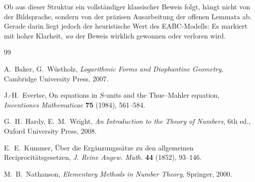 \documentclass[12pt,a4paper]{article}
\theoremstyle{plain}
\theoremstyle{definition}
\theoremstyle{remark}
\begin{document}
	Ob aus dieser Struktur ein vollständiger klassischer Beweis folgt, hängt nicht von der Bildsprache, sondern von der präzisen Ausarbeitung der offenen Lemmata ab. Gerade darin liegt jedoch der heuristische Wert des EABC-Modells: Es markiert mit hoher Klarheit, \emph{wo} der Beweis wirklich gewonnen oder verloren wird.
	
	\begin{thebibliography}{99}
		
		A.~Baker, G.~Wüstholz,
		\emph{Logarithmic Forms and Diophantine Geometry},
		Cambridge University Press, 2007.
		
		J.-H.~Evertse,
		On equations in \(S\)-units and the Thue--Mahler equation,
		\emph{Inventiones Mathematicae} \textbf{75} (1984), 561--584.
		
		G.~H.~Hardy, E.~M.~Wright,
		\emph{An Introduction to the Theory of Numbers},
		6th ed., Oxford University Press, 2008.
		
		E.~E.~Kummer,
		Über die Ergänzungssätze zu den allgemeinen Reciprocitätsgesetzen,
		\emph{J. Reine Angew. Math.} \textbf{44} (1852), 93--146.
		
		M.~B.~Nathanson,
		\emph{Elementary Methods in Number Theory},
		Springer, 2000.
		
	\end{thebibliography}
	
\end{document}
